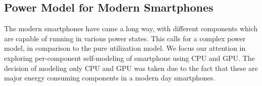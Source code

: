 \subsection{Power Model for Modern Smartphones}

The modern smartphones have came a long way, with different components which are capable of running in various power states.
This calls for a complex power model, in comparison to the pure utilization model.
We focus our attention in exploring per-component self-modeling of smartphone using CPU and GPU.
The decision of modeling only CPU and GPU was taken due to the fact that these are major energy consuming components in a modern day smartphones.

\fi


%
%
